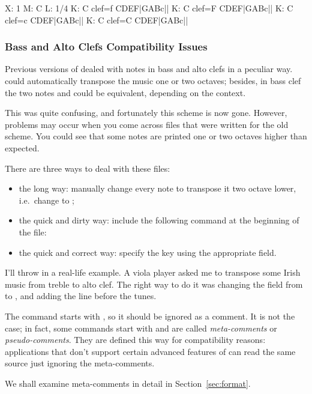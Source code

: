 \documentclass[a4paper,fullpage,12pt]{book}
\begin{document}
\begin{abcsource}
X: 1
M: C
L: 1/4
K: C clef=f
%
CDEF|GABc||
K: C clef=F
CDEF|GABc||
K: C clef=c
CDEF|GABc||
K: C clef=C
CDEF|GABc||
\end{abcsource}



\subsubsection{Bass and Alto Clefs Compatibility Issues}
\label{sec:bassclef}

Previous versions of \abcm{} dealed with notes in bass and alto clefs
in a peculiar way. \abcm{} could automatically transpose the music one
or two octaves; besides, in bass clef the two notes  and
 could be equivalent, depending on the context.

This was quite confusing, and fortunately this scheme is now gone.
However, problems may occur when you come across files that were
written for the old scheme. You could see that some notes are printed
one or two octaves higher than expected.

There are three ways to deal with these files:

\begin{itemize}
  
  \item the long way: manually change every note to transpose it two
  octave lower, i.e.\ change  to ;
  
  \item the quick and dirty way: include the following command at the
  beginning of the file: 
  
  \item the quick and correct way: specify the key using the appropriate
   field.

\end{itemize}

I'll throw in a real-life example. A viola player asked me to transpose
some Irish music from treble to alto clef. The right way to do it was
changing the  field from  to ,
and adding the  line before the tunes.

\begin{note}

  The  command starts with \car{\%}, so it
  should be ignored as a comment. It is not the case; in fact, some
  commands start with \car{\%\%} and are called \emph{meta-comments}
  or \emph{pseudo-comments}. They are defined this way for
  compatibility reasons: applications that don't support certain
  advanced features of \ABC{} can read the same source just ignoring
  the meta-comments.
  
  We shall examine meta-comments in detail in
  Section~\ref{sec:format}.

\end{note}
\end{document}
